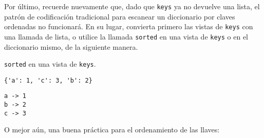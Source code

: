 Por último, recuerde nuevamente que, dado que \texttt{keys} ya no
devuelve una lista, el patrón de codificación tradicional para escanear
un diccionario por claves ordenadas no funcionará. En su lugar,
convierta primero las vistas de \texttt{keys} con una llamada de lista,
o utilice la llamada \texttt{sorted} en una vista de \texttt{keys} o en
el diccionario mismo, de la siguiente manera.\\

\begin{code} \texttt{sorted} en una vista de \texttt{keys}.

\begin{Shaded}
\begin{Highlighting}[]
\OperatorTok{=} \OperatorTok{=}\OperatorTok{=}\OperatorTok{=}\NormalTok{)}
\end{Highlighting}
\end{Shaded}

\begin{verbatim}
{'a': 1, 'c': 3, 'b': 2}
\end{verbatim}

\begin{Shaded}
\begin{Highlighting}[]
 
    \NormalTok{(}\SpecialCharTok{\{}\SpecialCharTok{\}}\SpecialStringTok{ {-}\textgreater{} }\SpecialCharTok{\{}\SpecialCharTok{\}}\SpecialStringTok{\textquotesingle{}}\NormalTok{)}
\end{Highlighting}
\end{Shaded}

\begin{verbatim}
a -> 1
b -> 2
c -> 3
\end{verbatim}
\end{code}

O mejor aún, una buena práctica para el ordenamiento de las llaves:\\


